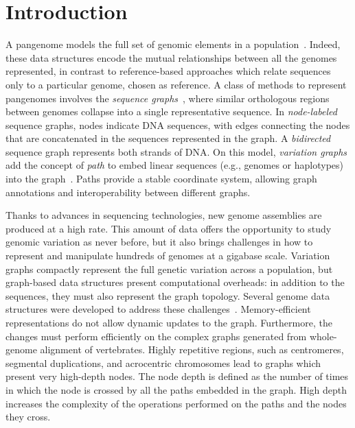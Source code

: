 \documentclass{bioinfo}
\begin{document}
    \maketitle

    

    \section{Introduction}

    A pangenome models the full set of genomic elements in a population~\citep{32453966}. Indeed, these data structures
    encode the mutual relationships between all the genomes represented, in contrast to reference-based approaches
    which relate sequences only to a particular genome, chosen as reference. A class of methods to represent
    pangenomes involves the \textit{sequence graphs}~\citep{2488477}, where similar orthologous regions between genomes
    collapse into a single representative sequence. In \textit{node-labeled} sequence graphs, nodes indicate DNA
    sequences, with edges connecting the nodes that are concatenated in the sequences represented in the graph. A
    \textit{bidirected} sequence graph represents both strands of DNA. On this model, \textit{variation graphs} add the
    concept of \textit{path} to embed linear sequences (e.g., genomes or haplotypes) into the graph~\citep{30125266}.
    Paths provide a stable coordinate system, allowing graph annotations and interoperability between different graphs.

    Thanks to advances in sequencing technologies, new genome assemblies are produced at a high rate. This amount of
    data offers the opportunity to study genomic variation as never before, but it also brings challenges in how to
    represent and manipulate hundreds of genomes at a gigabase scale. Variation graphs compactly represent the full
    genetic variation across a population, but graph-based data structures present computational overheads: in addition
    to the sequences, they must also represent the graph topology. Several genome data structures were developed to
    address these challenges~\citep{33040146}. Memory-efficient representations do not allow dynamic updates to the
    graph. Furthermore, the changes must perform efficiently on the complex graphs generated from whole-genome
    alignment of vertebrates. Highly repetitive regions, such as centromeres, segmental duplications, and acrocentric
    chromosomes lead to graphs which present very high-depth nodes. The node depth is defined as the
    number of times in which the node is crossed by all the paths embedded in the graph. High depth increases the
    complexity of the operations performed on the paths and the nodes they cross.
\end{document}
